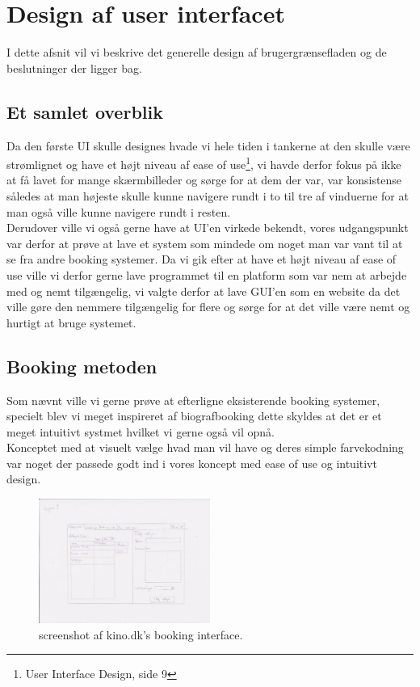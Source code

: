 \section{Design af user interfacet}
I dette afsnit vil vi beskrive det generelle design af brugergrænsefladen og de beslutninger der ligger bag.

\subsection{Et samlet overblik}
Da den første UI skulle designes hvade vi hele tiden i tankerne at den skulle være strømlignet og have et højt niveau af ease of use\footnote{User Interface Design, side 9}, vi havde derfor fokus på ikke at få lavet for mange skærmbilleder og sørge for at dem der var, var konsistense således at man højeste skulle kunne navigere rundt i to til tre af vinduerne for at man også ville kunne navigere rundt i resten.\\ Derudover ville vi også gerne have at UI'en virkede bekendt, vores udgangspunkt var derfor at prøve at lave et system som mindede om noget man var vant  til at se fra andre booking systemer.
Da vi gik efter at have et højt niveau af ease of use ville vi derfor gerne lave programmet til en platform som var nem at arbejde med og nemt tilgængelig, vi valgte derfor at lave GUI'en som en website  da det ville gøre den nemmere tilgængelig for flere og sørge for at det ville være nemt og hurtigt at bruge systemet.

\subsection{Booking metoden}
Som nævnt ville vi gerne prøve at efterligne eksisterende booking systemer, specielt blev vi meget inspireret af biografbooking dette skyldes at det er et meget intuitivt systmet hvilket vi gerne også vil opnå.\\ Konceptet med at visuelt vælge hvad man vil have og deres simple farvekodning var noget der passede godt ind i vores koncept med ease of use og intuitivt design.
\begin{figure}[h!]
  \caption{screenshot af kino.dk's booking interface.}
  \centering
    \includegraphics[width=0.5\textwidth]{Appendix/GUI-Prototype/PaperMockup/UdstyrsListe}
\end{figure}


